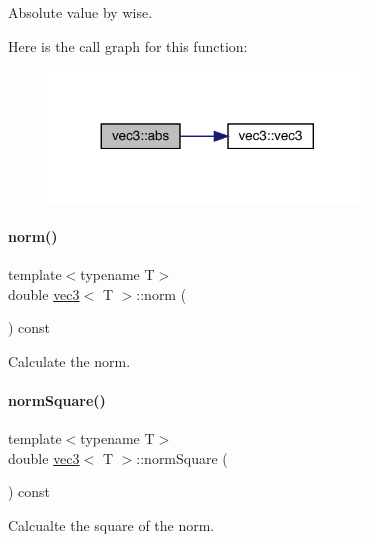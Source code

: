 Absolute value by wise. 

Here is the call graph for this function\+:\nopagebreak
\begin{figure}[H]
\begin{center}
\leavevmode
\includegraphics[width=239pt]{structvec3_abf0d30ac0a81beeacd36ddc86ec6ee83_cgraph}
\end{center}
\end{figure}
\mbox{\label{structvec3_a4cd4c90ed137753d0b6a2e83bb0170f7}} 
\paragraph{\texorpdfstring{norm()}{norm()}}
{\footnotesize\ttfamily template$<$typename T$>$ \\
double \mbox{\hyperlink{structvec3}{vec3}}$<$ T $>$\+::norm (\begin{DoxyParamCaption}{ }\end{DoxyParamCaption}) const\hspace{0.3cm}{\ttfamily [inline]}}



Calculate the norm. 

\mbox{\label{structvec3_a2441867c3e439981a865affd7cbcc09c}} 
\paragraph{\texorpdfstring{norm\+Square()}{normSquare()}}
{\footnotesize\ttfamily template$<$typename T$>$ \\
double \mbox{\hyperlink{structvec3}{vec3}}$<$ T $>$\+::norm\+Square (\begin{DoxyParamCaption}{ }\end{DoxyParamCaption}) const\hspace{0.3cm}{\ttfamily [inline]}}



Calcualte the square of the norm. 

